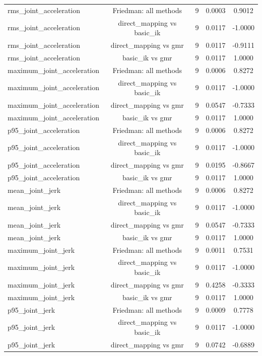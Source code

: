 \begin{table}[t]
{\begin{tabular}{lcccc}
rms\_joint\_acceleration & Friedman: all methods & 9 & 0.0003 & 0.9012 \\
rms\_joint\_acceleration & direct\_mapping vs basic\_ik & 9 & 0.0117 & -1.0000 \\
rms\_joint\_acceleration & direct\_mapping vs gmr & 9 & 0.0117 & -0.9111 \\
rms\_joint\_acceleration & basic\_ik vs gmr & 9 & 0.0117 & 1.0000 \\
maximum\_joint\_acceleration & Friedman: all methods & 9 & 0.0006 & 0.8272 \\
maximum\_joint\_acceleration & direct\_mapping vs basic\_ik & 9 & 0.0117 & -1.0000 \\
maximum\_joint\_acceleration & direct\_mapping vs gmr & 9 & 0.0547 & -0.7333 \\
maximum\_joint\_acceleration & basic\_ik vs gmr & 9 & 0.0117 & 1.0000 \\
p95\_joint\_acceleration & Friedman: all methods & 9 & 0.0006 & 0.8272 \\
p95\_joint\_acceleration & direct\_mapping vs basic\_ik & 9 & 0.0117 & -1.0000 \\
p95\_joint\_acceleration & direct\_mapping vs gmr & 9 & 0.0195 & -0.8667 \\
p95\_joint\_acceleration & basic\_ik vs gmr & 9 & 0.0117 & 1.0000 \\
mean\_joint\_jerk & Friedman: all methods & 9 & 0.0006 & 0.8272 \\
mean\_joint\_jerk & direct\_mapping vs basic\_ik & 9 & 0.0117 & -1.0000 \\
mean\_joint\_jerk & direct\_mapping vs gmr & 9 & 0.0547 & -0.7333 \\
mean\_joint\_jerk & basic\_ik vs gmr & 9 & 0.0117 & 1.0000 \\
maximum\_joint\_jerk & Friedman: all methods & 9 & 0.0011 & 0.7531 \\
maximum\_joint\_jerk & direct\_mapping vs basic\_ik & 9 & 0.0117 & -1.0000 \\
maximum\_joint\_jerk & direct\_mapping vs gmr & 9 & 0.4258 & -0.3333 \\
maximum\_joint\_jerk & basic\_ik vs gmr & 9 & 0.0117 & 1.0000 \\
p95\_joint\_jerk & Friedman: all methods & 9 & 0.0009 & 0.7778 \\
p95\_joint\_jerk & direct\_mapping vs basic\_ik & 9 & 0.0117 & -1.0000 \\
p95\_joint\_jerk & direct\_mapping vs gmr & 9 & 0.0742 & -0.6889 \\

\end{tabular}}
\end{table}
